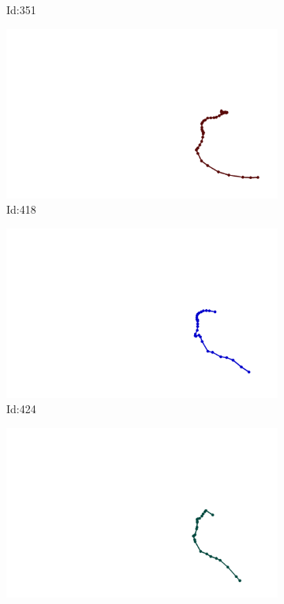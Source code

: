 \documentclass[12pt,twoside]{report}
\begin{document}
\begin{figure}
\begin{subfigure}[b]{0.20\textwidth}
\caption{Id:351}
\end{subfigure}
\begin{subfigure}[b]{0.20\textwidth}
\centering
\includegraphics[width=\textwidth]{../../trajectories/418.png}
\caption{Id:418}
\end{subfigure}
\begin{subfigure}[b]{0.20\textwidth}
\centering
\includegraphics[width=\textwidth]{../../trajectories/424.png}
\caption{Id:424}
\end{subfigure}
\begin{subfigure}[b]{0.20\textwidth}
\centering
\includegraphics[width=\textwidth]{../../trajectories/692.png}

\end{subfigure}
\end{figure}
\end{document}

